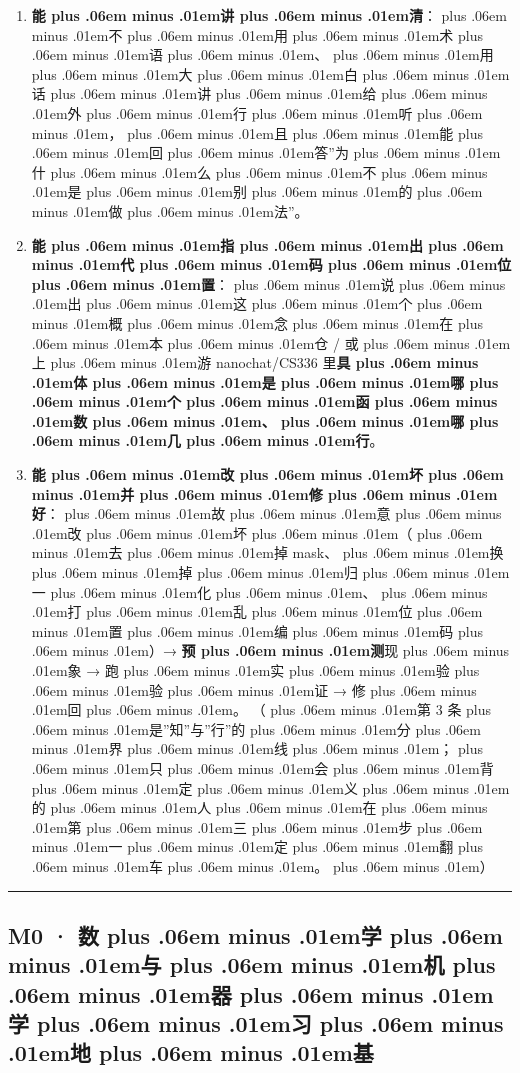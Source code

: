 \documentclass[
]{article}
\newcommand{\passthrough}[1]{#1}
\providecommand{\tightlist}{%
  \setlength{\itemsep}{0pt}\setlength{\parskip}{0pt}}
\def\zh#1{{\zhfont #1}}
\def\sym#1{{\symfont #1}}
\def\codezh#1{{\zhmonofont #1}}
\def\zhglue{\hskip0pt plus .06em minus .01em}
\begin{document}
\begin{enumerate}
\def\labelenumi{\arabic{enumi}.}
\tightlist
\item
  \textbf{\zh{能\zhglue 讲\zhglue 清}}\zh{：\zhglue 不\zhglue 用\zhglue 术\zhglue 语\zhglue 、\zhglue 用\zhglue 大\zhglue 白\zhglue 话\zhglue 讲\zhglue 给\zhglue 外\zhglue 行\zhglue 听\zhglue ，\zhglue 且\zhglue 能\zhglue 回\zhglue 答}''\zh{为\zhglue 什\zhglue 么\zhglue 不\zhglue 是\zhglue 别\zhglue 的\zhglue 做\zhglue 法}''\zh{。}
\item
  \textbf{\zh{能\zhglue 指\zhglue 出\zhglue 代\zhglue 码\zhglue 位\zhglue 置}}\zh{：\zhglue 说\zhglue 出\zhglue 这\zhglue 个\zhglue 概\zhglue 念\zhglue 在\zhglue 本\zhglue 仓} \passthrough{\codezh{{\zh{手}}{\zh{写}}/}} \zh{或\zhglue 上\zhglue 游} nanochat/CS336 \zh{里}\textbf{\zh{具\zhglue 体\zhglue 是\zhglue 哪\zhglue 个\zhglue 函\zhglue 数\zhglue 、\zhglue 哪\zhglue 几\zhglue 行}}\zh{。}
\item
  \textbf{\zh{能\zhglue 改\zhglue 坏\zhglue 并\zhglue 修\zhglue 好}}\zh{：\zhglue 故\zhglue 意\zhglue 改\zhglue 坏\zhglue （\zhglue 去\zhglue 掉} mask\zh{、\zhglue 换\zhglue 掉\zhglue 归\zhglue 一\zhglue 化\zhglue 、\zhglue 打\zhglue 乱\zhglue 位\zhglue 置\zhglue 编\zhglue 码\zhglue ）}\sym{→} \textbf{\zh{预\zhglue 测}}\zh{现\zhglue 象} \sym{→} \zh{跑\zhglue 实\zhglue 验\zhglue 验\zhglue 证} \sym{→} \zh{修\zhglue 回\zhglue 。} \zh{（\zhglue 第} 3 \zh{条\zhglue 是}''\zh{知}''\zh{与}''\zh{行}''\zh{的\zhglue 分\zhglue 界\zhglue 线\zhglue ；\zhglue 只\zhglue 会\zhglue 背\zhglue 定\zhglue 义\zhglue 的\zhglue 人\zhglue 在\zhglue 第\zhglue 三\zhglue 步\zhglue 一\zhglue 定\zhglue 翻\zhglue 车\zhglue 。\zhglue ）}
\end{enumerate}

\begin{center}\rule{0.5\linewidth}{0.5pt}\end{center}

\subsection{M0 \sym{·} \zh{数\zhglue 学\zhglue 与\zhglue 机\zhglue 器\zhglue 学\zhglue 习\zhglue 地\zhglue 基}}\label{m0-ux6570ux5b66ux4e0eux673aux5668ux5b66ux4e60ux5730ux57fa}
\end{document}
